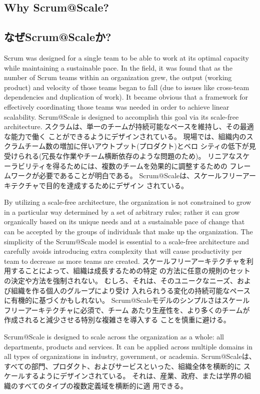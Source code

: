 \documentclass[12pt,a4paper,parskip=full]{scrartcl}
\begin{document}
\subsection{Why Scrum@Scale?}
\fi
\subsection{なぜScrum@Scaleか?}
Scrum was designed for a single team to be able to work at its optimal
capacity while maintaining a sustainable pace. In the field, it was found
that as the number of Scrum teams within an organization grew, the 
output (working product) and velocity of those teams began to fall (due to
issues like cross-team dependencies and duplication of work). It became
obvious that a framework for effectively coordinating those teams was
needed in order to achieve linear scalability. Scrum@Scale is designed to
accomplish this goal via its scale-free architecture.
\fi
スクラムは、単一のチームが持続可能なペースを維持し、その最適な能力で働く
ことができるようにデザインされている。
現場では、組織内のスクラムチーム数の増加に伴いアウトプット(プロダクト)とベロ
シティの低下が見受けられる(冗長な作業やチーム横断依存のような問題のため)。
リニアなスケーラビリティを得るためには、複数のチームを効果的に調整するための
フレームワークが必要であることが明白である。
Scrum@Scaleは、スケールフリーアーキテクチャで目的を達成するためにデザイン
されている。

By utilizing a scale-free architecture, the organization is not constrained
to grow in a particular way determined by a set of arbitrary rules; rather
it can grow organically based on its unique needs and at a sustainable pace
of change that can be accepted by the groups of individuals that make up
the organization. The simplicity of the Scrum@Scale model is essential to a scale-free architecture and carefully avoids introducing extra complexity that will cause productivity per team to decrease as more teams are created.
\fi
スケールフリーアーキテクチャを利用することによって、組織は成長するための特定
の方法に任意の規則のセットの決定や方法を強制されない。
むしろ、それは、そのユニークなニーズ、および組織を作る個人のグループにより受け
入れられうる変化の持続可能なペースに有機的に基づくかもしれない。
Scrum@Scaleモデルのシンプルさはスケールフリーアーキテクチャに必須で、チーム
あたり生産性を、より多くのチームが作成されると減少させる特別な複雑さを導入する
ことを慎重に避ける。

Scrum@Scale is designed to scale across the organization as a whole: all
departments, products and services. It can be applied across multiple
domains in all types of organizations in industry, government, or academia.
\fi
Scrum@Scaleは、すべての部門、プロダクト、およびサービスといった、組織全体を横断的に
スケールするようにデザインされている。
それは、産業、政府、または学界の組織のすべてのタイプの複数定義域を横断的に適
用できる。
\end{document}
